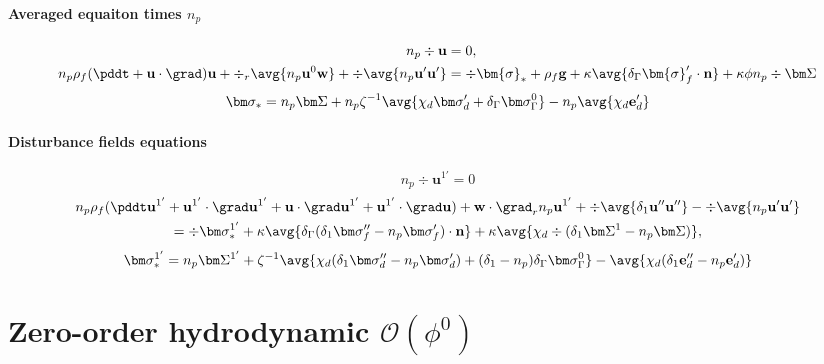 \paragraph*{Averaged equaiton times $n_p$}
\begin{align}
    n_p \div\textbf{u}&=0, \\
    n_p \rho_f (\pddt 
    + \textbf{u}\cdot \grad)
    \textbf{u}
    +\div_r\avg{n_p \textbf{u}^0\textbf{w}}
    +\div\avg{n_p \textbf{u}'\textbf{u}'}
    &= 
    \div \bm{\sigma}_*
    + \rho_f \textbf{g} 
    + \kappa \avg{\delta_\Gamma \bm{\sigma}_f' \cdot \textbf{n}} 
    + \kappa \phi n_p \div\bm\Sigma
\end{align}
\begin{equation}
    \bm\sigma_* = 
    n_p \bm\Sigma
    + n_p \zeta^{-1}\avg{\chi_d \bm\sigma_d' + \delta_\Gamma \bm\sigma_\Gamma^0}
    - n_p \avg{ \chi_d \textbf{e}_d'}
\end{equation}
\paragraph*{Disturbance fields equations}
\begin{equation}
    n_p \div \textbf{u}^{1'} = 0
\end{equation}
\begin{multline*}
   n_p \rho_f(\pddt \textbf{u}^{1'}
   + \textbf{u}^{1'} \cdot \grad \textbf{u}^{1'}
   + \textbf{u} \cdot \grad \textbf{u}^{1'}
   + \textbf{u}^{1'} \cdot \grad \textbf{u})
   +\textbf{w}\cdot  \grad_r n_p \textbf{u}^{1'}
   + \div \avg{\delta_1 \textbf{u}'' \textbf{u}''}
   - \div \avg{n_p \textbf{u}' \textbf{u}'}
   \\
   = 
   \div \bm\sigma_*^{1'}
   +\kappa\avg{\delta_\Gamma  (\delta_1\bm\sigma_f'' - n_p \bm\sigma_f')\cdot \textbf{n}}
   +\kappa \avg{\chi_d \div(\delta_1 \bm\Sigma^1 - n_p \bm\Sigma)},
\end{multline*}
\begin{equation}
    \bm\sigma_*^{1'} = 
    n_p \bm\Sigma^{1'}
    + \zeta^{-1}\avg{\chi_d (\delta_1\bm\sigma_d'' - n_p \bm\sigma_d') + (\delta_1-n_p)\delta_\Gamma \bm\sigma_\Gamma^0}
    - \avg{\chi_d (\delta_1 \textbf{e}_d''- n_p \textbf{e}_d')}
\end{equation}


\section{Zero-order hydrodynamic $\mathcal{O}( \phi^0)$}

